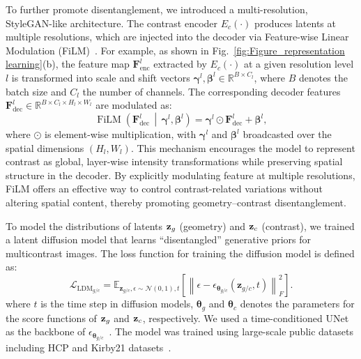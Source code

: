 \documentclass[journal,twoside,web]{ieeecolor}
\begin{document}
To further promote disentanglement, we introduced a multi-resolution, StyleGAN-like architecture. 
The contrast encoder $E_c(\cdot)$ produces latents at multiple resolutions, which are injected into 
the decoder via Feature-wise Linear Modulation (FiLM)~\cite{perez2018film}. For example, as shown in Fig.~\ref{fig:Figure_representation learning}(b), the feature map $\mathbf{F}_{\mathrm{enc}}^{l}$ extracted by $E_c(\cdot)$ at a given resolution level $l$ is transformed into 
scale and shift vectors $\boldsymbol{\gamma}^{l}, \boldsymbol{\beta}^{l} \in \mathbb{R}^{B \times C_{l}}$, 
where $B$ denotes the batch size and $C_{l}$ the number of channels. The corresponding decoder 
features $\mathbf{F}_{\mathrm{dec}}^{l} \in \mathbb{R}^{B \times C_{l} \times H_{l} \times W_{l}}$ 
are modulated as:
\begin{equation}
\operatorname{FiLM}\!\left(\mathbf{F}_{\mathrm{dec}}^{l} \,\middle|\, 
\boldsymbol{\gamma}^{l}, \boldsymbol{\beta}^{l}\right)
= \boldsymbol{\gamma}^{l} \odot \mathbf{F}_{\mathrm{dec}}^{l} + \boldsymbol{\beta}^{l},
\end{equation}
where $\odot$ is element-wise multiplication, with 
$\boldsymbol{\gamma}^{l}$ and $\boldsymbol{\beta}^{l}$ broadcasted over the spatial dimensions $(H_{l}, W_{l})$. This mechanism encourages the model to represent contrast as global, layer-wise intensity transformations while preserving spatial structure in the decoder. By explicitly modulating feature at multiple resolutions, FiLM offers an effective way to control contrast-related variations without altering spatial content, thereby promoting geometry–contrast disentanglement.

To model the distributions of latents ${\mathbf z}_g$ (geometry) and ${\mathbf z}_c$ (contrast), we trained a latent diffusion model that learns “disentangled” generative priors for multicontrast images. The loss function for training the diffusion model is defined as:
\begin{equation}
    \mathcal{L}_{\text{LDM}_{g/c}} = \mathbb{E}_{\mathbf{z}_{g/c}, \epsilon \sim \mathcal{N}(0,1), t} \left[ 
        \left\| \epsilon - \epsilon_{\boldsymbol{\theta}_{g/c}} \left( \mathbf{z}_{g/c}, t \right) \right\|_F^2 
    \right]. \label{loss_ldm}
\end{equation}
where $t$ is the time step in diffusion models, $\boldsymbol{\theta}_g$ and $\boldsymbol{\theta}_c$ denotes the parameters for the score functions of ${\mathbf z}_g$  and ${\mathbf z}_c$, respectively. We used a time-conditioned UNet as the backbone of $\epsilon_{\boldsymbol{\theta}_{g/c}}$~\cite{rombach2022high}. The model was trained using large-scale public datasets including HCP and Kirby21 datasets~\cite{van2013wu,landman2011multi}.
\end{document}
